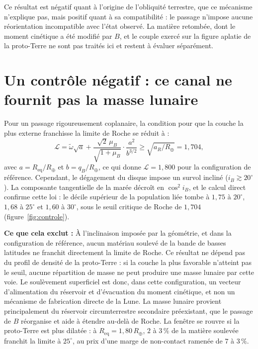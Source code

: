 \documentclass[11pt,a4paper]{article}
\begin{document}
Ce résultat est négatif quant à l'origine de l'obliquité terrestre, que ce mécanisme n'explique pas, mais positif quant à sa compatibilité : le passage n'impose aucune réorientation incompatible avec l'état observé. La matière retombée, dont le moment cinétique a été modifié par $B$, et le couple exercé sur la figure aplatie de la proto-Terre ne sont pas traités ici et restent à évaluer séparément.

\section{Un contrôle négatif : ce canal ne fournit pas la masse lunaire}

Pour un passage rigoureusement coplanaire, la condition pour que la couche la plus externe franchisse la limite de Roche se réduit à :
\begin{equation}
\mathcal{L} = \tilde{\omega}\sqrt{a} + \frac{\sqrt{2}\,\mu_B}{\sqrt{1+\mu_B}} \cdot \frac{a^2}{b^{3/2}} \ge \sqrt{a_R/R_\oplus} = 1{,}704,
\end{equation}
avec $a = R_{\mathrm{eq}}/R_\oplus$ et $b = q_B/R_\oplus$, ce qui donne $\mathcal{L} = 1{,}800$ pour la configuration de référence. Cependant, le dégagement du disque impose un survol incliné ($i_B \gtrsim 20^\circ$). La composante tangentielle de la marée décroît en $\cos^2 i_B$, et le calcul direct confirme cette loi : le décile supérieur de la population liée tombe à $1{,}75$ à $20^\circ$, $1{,}68$ à $25^\circ$ et $1{,}60$ à $30^\circ$, sous le seuil critique de Roche de $1{,}704$ (figure~\ref{fig:controle}).

\noindent\textbf{Ce que cela exclut :} À l'inclinaison imposée par la géométrie, et dans la configuration de référence, aucun matériau soulevé de la bande de basses latitudes ne franchit directement la limite de Roche. Ce résultat ne dépend pas du profil de densité de la proto-Terre : si la couche la plus favorable n'atteint pas le seuil, aucune répartition de masse ne peut produire une masse lunaire par cette voie. Le soulèvement superficiel est donc, dans cette configuration, un vecteur d'alimentation du réservoir et d'évacuation du moment cinétique, et non un mécanisme de fabrication directe de la Lune. La masse lunaire provient principalement du réservoir circumterrestre secondaire préexistant, que le passage de $B$ réorganise et aide à étendre au-delà de Roche. La fenêtre se rouvre si la proto-Terre est plus dilatée : à $R_{\mathrm{eq}} = 1{,}80\,R_\oplus$, $2$ à $3\,\%$ de la matière soulevée franchit la limite à $25^\circ$, au prix d'une marge de non-contact ramenée de $7$ à $3\,\%$.
\end{document}
